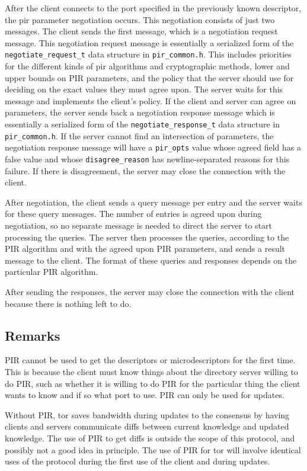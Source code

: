 \documentclass{article}
\begin{document}
    After the client connects to the port specified in the previously known descriptor, the pir parameter negotiation occurs. This negotiation consists of just two messages. The client sends the first message, which is a negotiation request message. This negotiation request message is essentially a serialized form of the \texttt{negotiate\_request\_t} data structure in \texttt{pir\_common.h}. This includes priorities for the different kinds of pir algorithms and cryptographic methods, lower and upper bounds on PIR parameters, and the policy that the server should use for deciding on the exact values they must agree upon. The server waits for this message and implements the client's policy. If the client and server can agree on parameters, the server sends back a negotiation response message which is essentially a serialized form of the \texttt{negotiate\_response\_t} data structure in \texttt{pir\_common.h}. If the server cannot find an intersection of parameters, the negotiation response message will have a \texttt{pir\_opts} value whose agreed field has a false value and whose \texttt{disagree\_reason} has newline-separated reasons for this failure. If there is disagreement, the server may close the connection with the client.

    After negotiation, the client sends a query message per entry and the server waits for these query messages. The number of entries is agreed upon during negotiation, so no separate message is needed to direct the server to start processing the queries. The server then processes the queries, according to the PIR algorithm and with the agreed upon PIR parameters, and sends a result message to the client. The format of these queries and responses depends on the particular PIR algorithm.

    After sending the responses, the server may close the connection with the client because there is nothing left to do.

\subsection{Remarks}

    PIR cannot be used to get the descriptors or microdescriptors for the first time. This is because the client must know things about the directory server willing to do PIR, such as whether it is willing to do PIR for the particular thing the client wants to know and if so what port to use. PIR can only be used for updates.

    Without PIR, tor saves bandwidth during updates to the consensus by having clients and servers communicate diffs between current knowledge and updated knowledge. The use of PIR to get diffs is outside the scope of this protocol, and possibly not a good idea in principle. The use of PIR for tor will involve identical uses of the protocol during the first use of the client and during updates.
\end{document}
